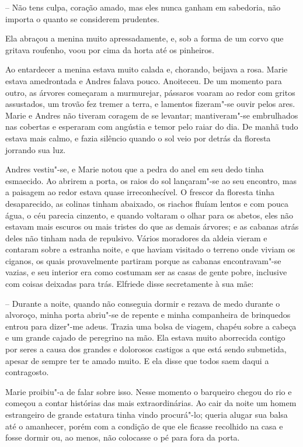 -- Não tens culpa, coração amado, mas eles nunca ganham em
sabedoria, não importa o quanto se considerem prudentes.

Ela abraçou a menina muito apressadamente, e, sob a forma de um corvo que
gritava roufenho, voou por cima da horta até os pinheiros.
 
Ao entardecer a menina estava muito calada e, chorando, beijava a rosa.
Marie estava amedrontada e Andres falava pouco. Anoiteceu. De um
momento para outro, as árvores começaram a murmurejar, pássaros voaram
ao redor com gritos assustados, um trovão fez tremer a terra, e
lamentos fizeram"-se ouvir pelos ares. Marie e Andres não tiveram
coragem de se levantar; mantiveram"-se embrulhados nas cobertas e
esperaram com angústia e temor pelo raiar do dia. De manhã tudo estava
mais calmo, e fazia silêncio quando o sol veio por detrás da floresta
jorrando sua luz.

Andres vestiu"-se, e Marie notou que a pedra do anel em seu dedo tinha
esmaecido. Ao abrirem a porta, os raios do sol lançaram"-se ao seu
encontro, mas a paisagem ao redor estava quase irreconhecível. O
frescor da floresta tinha desaparecido, as colinas tinham abaixado, os
riachos fluíam lentos e com pouca água, o céu parecia cinzento, e
quando voltaram o olhar para os abetos, eles não estavam mais escuros
ou mais tristes do que as demais árvores; e as cabanas atrás deles não
tinham nada de repulsivo. Vários moradores da aldeia vieram e contaram
sobre a estranha noite, e que haviam visitado o terreno onde viviam os
ciganos, os quais provavelmente partiram porque as cabanas
encontravam"-se vazias, e seu interior era como costumam ser as casas de
gente pobre, inclusive com coisas deixadas para trás. Elfriede disse
secretamente à sua mãe:

-- Durante a noite, quando não conseguia dormir e rezava de medo
durante o alvoroço, minha porta abriu"-se de repente e minha companheira
de brinquedos entrou para dizer"-me adeus. Trazia uma bolsa de viagem,
chapéu sobre a cabeça e um grande cajado de peregrino na mão. Ela
estava muito aborrecida contigo por seres a causa dos grandes e
dolorosos castigos a que está sendo submetida, apesar de sempre ter te
amado muito. E ela disse que todos saem daqui a contragosto.

Marie proibiu"-a de falar sobre isso. Nesse momento o barqueiro chegou do
rio e começou a contar histórias das mais extraordinárias. Ao cair da
noite um homem estrangeiro de grande estatura tinha vindo procurá"-lo;
queria alugar sua balsa até o amanhecer, porém com a condição de que
ele ficasse recolhido na casa e fosse dormir ou, ao menos, não
colocasse o pé para fora da porta.

